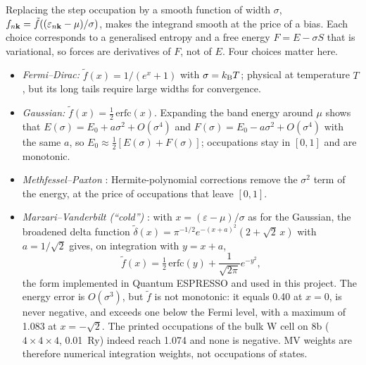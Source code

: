 Replacing the step occupation by a smooth function of width $\sigma$, $f_{n\mathbf{k}} = \tilde f((\varepsilon_{n\mathbf{k}}-\mu)/\sigma)$,
makes the integrand smooth at the price of a bias. Each choice corresponds to a generalised entropy and a free energy
$F = E - \sigma S$ that is variational, so forces are derivatives of $F$, not of $E$. Four choices matter here.
\begin{itemize}
\item \emph{Fermi--Dirac:} $\tilde f(x) = 1/(e^x+1)$ with $\sigma = k_{\mathrm{B}}T$; physical at temperature $T$, but its long
tails require large widths for convergence.
\item \emph{Gaussian:} $\tilde f(x) = \tfrac12\,\mathrm{erfc}(x)$. Expanding the band energy around $\mu$ shows that
$E(\sigma) = E_0 + a\sigma^2 + O(\sigma^4)$ and $F(\sigma) = E_0 - a\sigma^2 + O(\sigma^4)$ with the same $a$, so
$E_0 \approx \tfrac12[E(\sigma)+F(\sigma)]$; occupations stay in $[0,1]$ and are monotonic.
\item \emph{Methfessel--Paxton} \citep{Methfessel1989}: Hermite-polynomial corrections remove the $\sigma^2$ term of the
energy, at the price of occupations that leave $[0,1]$.
\item \emph{Marzari--Vanderbilt (``cold'')} \citep{Marzari1999}: with $x = (\varepsilon-\mu)/\sigma$ as for the
Gaussian, the broadened delta function $\tilde\delta(x) = \pi^{-1/2}e^{-(x+a)^2}(2+\sqrt2\,x)$ with $a = 1/\sqrt2$ gives,
on integration with $y = x+a$,
\begin{equation}
\tilde f(x) = \tfrac12\,\mathrm{erfc}(y) + \frac{1}{\sqrt{2\pi}}e^{-y^2} ,
\label{eq:mono-dft-mv}
\end{equation}
the form implemented in Quantum ESPRESSO and used in this project. The energy error is $O(\sigma^3)$, but $\tilde f$
is not monotonic: it equals 0.40 at $x = 0$, is never negative, and exceeds one below the Fermi level, with a maximum
of 1.083 at $x = -\sqrt2$. The printed occupations of the bulk W cell on 8b ($4\times4\times4$, 0.01~Ry) indeed reach
1.074 and none is negative. MV weights are therefore numerical integration weights, not occupations of states.
\end{itemize}

